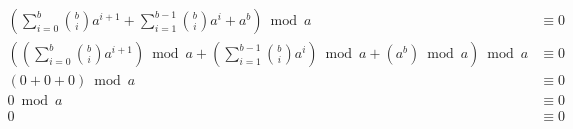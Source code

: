 \documentclass[12pt]{article}
\begin{document}
\begin{enumerate}
\begin{align*}
(\sum\limits_{i = 0}^{b} {b \choose i} a^{i+1} + \sum\limits_{i = 1}^{b - 1} {b \choose i} a^i + a^b)\bmod{a}&\equiv 0\\
((\sum\limits_{i = 0}^{b} {b \choose i} a^{i+1})\bmod{a} + (\sum\limits_{i = 1}^{b - 1} {b \choose i} a^i)\bmod{a} + (a^b)\bmod{a})\bmod{a}&\equiv 0\\
(0 + 0 + 0)\bmod{a}&\equiv 0\\
0\bmod{a}&\equiv 0\\
0&\equiv 0\\
\end{align*}
\end{enumerate}
\end{document}
